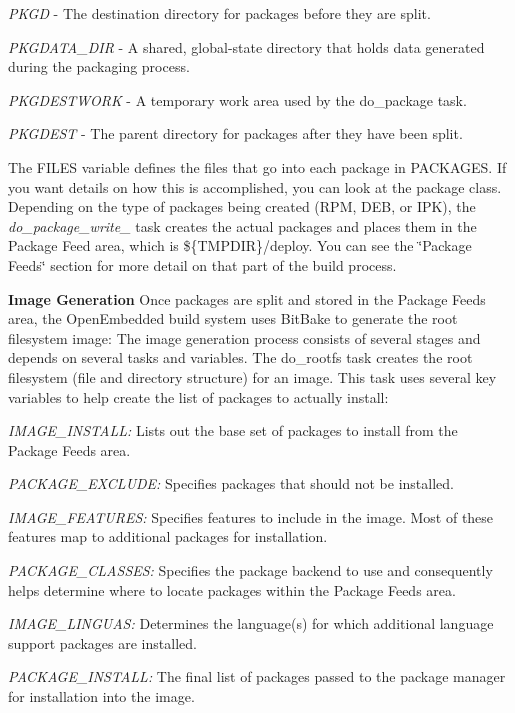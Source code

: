 \begin{DoxyItemize}
\begin{DoxyItemize}
\item {\itshape P\+K\+GD} -\/ The destination directory for packages before they are split.
\item {\itshape P\+K\+G\+D\+A\+T\+A\+\_\+\+D\+IR} -\/ A shared, global-\/state directory that holds data generated during the packaging process.
\item {\itshape P\+K\+G\+D\+E\+S\+T\+W\+O\+RK} -\/ A temporary work area used by the do\+\_\+package task.
\item {\itshape P\+K\+G\+D\+E\+ST} -\/ The parent directory for packages after they have been split.
\end{DoxyItemize}

The F\+I\+L\+ES variable defines the files that go into each package in P\+A\+C\+K\+A\+G\+ES. If you want details on how this is accomplished, you can look at the package class. Depending on the type of packages being created (R\+PM, D\+EB, or I\+PK), the {\itshape do\+\_\+package\+\_\+write\+\_\+} task creates the actual packages and places them in the Package Feed area, which is \$\{T\+M\+P\+D\+IR\}/deploy. You can see the \char`\"{}\+Package Feeds\char`\"{} section for more detail on that part of the build process.
\item {\bfseries Image Generation} Once packages are split and stored in the Package Feeds area, the Open\+Embedded build system uses Bit\+Bake to generate the root filesystem image\+:  The image generation process consists of several stages and depends on several tasks and variables. The do\+\_\+rootfs task creates the root filesystem (file and directory structure) for an image. This task uses several key variables to help create the list of packages to actually install\+:
\begin{DoxyItemize}
\item {\itshape I\+M\+A\+G\+E\+\_\+\+I\+N\+S\+T\+A\+LL\+:} Lists out the base set of packages to install from the Package Feeds area.
\item {\itshape P\+A\+C\+K\+A\+G\+E\+\_\+\+E\+X\+C\+L\+U\+DE\+:} Specifies packages that should not be installed.
\item {\itshape I\+M\+A\+G\+E\+\_\+\+F\+E\+A\+T\+U\+R\+ES\+:} Specifies features to include in the image. Most of these features map to additional packages for installation.
\item {\itshape P\+A\+C\+K\+A\+G\+E\+\_\+\+C\+L\+A\+S\+S\+ES\+:} Specifies the package backend to use and consequently helps determine where to locate packages within the Package Feeds area.
\item {\itshape I\+M\+A\+G\+E\+\_\+\+L\+I\+N\+G\+U\+AS\+:} Determines the language(s) for which additional language support packages are installed.
\item {\itshape P\+A\+C\+K\+A\+G\+E\+\_\+\+I\+N\+S\+T\+A\+LL\+:} The final list of packages passed to the package manager for installation into the image.
\end{DoxyItemize}


\end{DoxyItemize}
